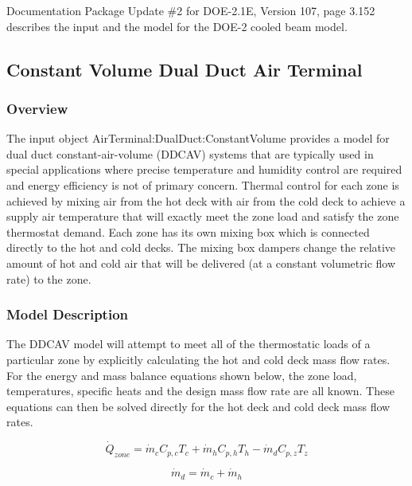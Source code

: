 Documentation Package Update \#2 for DOE-2.1E, Version 107, page 3.152 describes the input and the model for the DOE-2 cooled beam model.

\subsection{Constant Volume Dual Duct Air Terminal}\label{constant-volume-dual-duct-air-terminal}

\subsubsection{Overview}\label{overview-3-000}

The input object AirTerminal:DualDuct:ConstantVolume provides a model for dual duct constant-air-volume (DDCAV) systems that are typically used in special applications where precise temperature and humidity control are required and energy efficiency is not of primary concern. Thermal control for each zone is achieved by mixing air from the hot deck with air from the cold deck to achieve a supply air temperature that will exactly meet the zone load and satisfy the zone thermostat demand. Each zone has its own mixing box which is connected directly to the hot and cold decks. The mixing box dampers change the relative amount of hot and cold air that will be delivered (at a constant volumetric flow rate) to the zone.

\subsubsection{Model Description}\label{model-description-2-000}

The DDCAV model will attempt to meet all of the thermostatic loads of a particular zone by explicitly calculating the hot and cold deck mass flow rates. For the energy and mass balance equations shown below, the zone load, temperatures, specific heats and the design mass flow rate are all known. These equations can then be solved directly for the hot deck and cold deck mass flow rates.

\begin{equation}
\dot Q_{zone} = \dot m_c C_{p,c} T_c + \dot m_h C_{p,h}T_h - \dot m_d C_{p,z} T_z
\end{equation}

\begin{equation}
\dot m_d = \dot m_c + \dot m_h
\end{equation}

